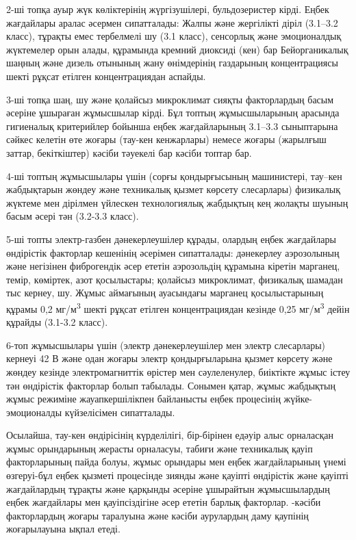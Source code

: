 2-ші топқа ауыр жүк көліктерінің жүргізушілері, бульдозеристер кірді.
Еңбек жағдайлары аралас әсермен сипатталады: Жалпы және жергілікті діріл
(3.1--3.2 класс), тұрақты емес тербелмелі шу (3.1 класс), сенсорлық және
эмоционалдық жүктемелер орын алады, құрамында кремний диоксиді (кен) бар
Бейорганикалық шаңның және дизель отынының жану өнімдерінің газдарының
концентрациясы шекті рұқсат етілген концентрациядан аспайды.

3-ші топқа шаң, шу және қолайсыз микроклимат сияқты факторлардың басым
әсеріне ұшыраған жұмысшылар кірді. Бұл топтың жұмысшыларының арасында
гигиеналық критерийлер бойынша еңбек жағдайларының 3.1--3.3 сыныптарына
сәйкес келетін өте жоғары (тау-кен кенжарлары) немесе жоғары (жарылғыш
заттар, бекіткіштер) кәсіби тәуекелі бар кәсіби топтар бар.

4-ші топтың жұмысшылары үшін (сорғы қондырғысының машинистері, тау--кен
жабдықтарын жөндеу және техникалық қызмет көрсету слесарлары) физикалық
жүктеме мен дірілмен үйлескен технологиялық жабдықтың кең жолақты шуының
басым әсері тән (3.2-3.3 класс).

5-ші топты электр-газбен дәнекерлеушілер құрады, олардың еңбек
жағдайлары өндірістік факторлар кешенінің әсерімен сипатталады:
дәнекерлеу аэрозолының және негізінен фиброгендік әсер ететін
аэрозольдің құрамына кіретін марганец, темір, көміртек, азот
қосылыстары; қолайсыз микроклимат, физикалық шамадан тыс кернеу, шу.
Жұмыс аймағының ауасындағы марганец қосылыстарының құрамы 0,2
мг/м\textsuperscript{3} шекті рұқсат етілген концентрациядан кезінде
0,25 мг/м\textsuperscript{3} дейін құрайды (3.1-3.2 класс).

6-топ жұмысшылары үшін (электр дәнекерлеушілер мен электр слесарлары)
кернеуі 42 В және одан жоғары электр қондырғыларына қызмет көрсету және
жөндеу кезінде электромагниттік өрістер мен сәулеленулер, биіктікте
жұмыс істеу тән өндірістік факторлар болып табылады. Сонымен қатар,
жұмыс жабдықтың жұмыс режиміне жауапкершілікпен байланысты еңбек
процесінің жүйке-эмоционалды күйзелісімен сипатталады.

Осылайша, тау-кен өндірісінің күрделілігі, бір-бірінен едәуір алыс
орналасқан жұмыс орындарының жерасты орналасуы, табиғи және техникалық
қауіп факторларының пайда болуы, жұмыс орындары мен еңбек жағдайларының
үнемі өзгеруі-бұл еңбек қызметі процесінде зиянды және қауіпті
өндірістік және қауіпті жағдайлардың тұрақты және қарқынды әсеріне
ұшырайтын жұмысшылардың еңбек жағдайлары мен қауіпсіздігіне әсер ететін
барлық факторлар. -кәсіби факторлардың жоғары таралуына және кәсіби
аурулардың даму қаупінің жоғарылауына ықпал етеді.

